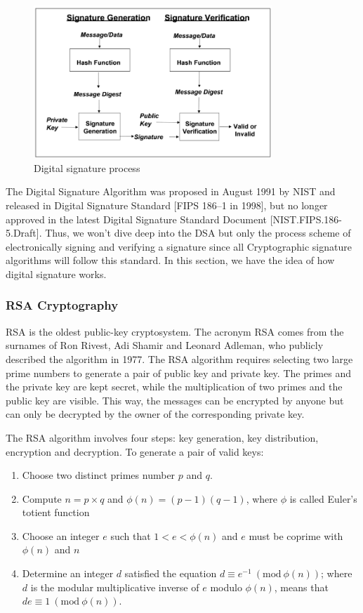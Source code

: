 \begin{figure}[ht!]
  \centering
  \includegraphics[width=0.8\textwidth]{images/digital_signature.png}
  \caption[Digital signature process]{Digital signature process}
  \label{fig:digital_signature}
\end{figure}

The Digital Signature Algorithm was proposed in August 1991 by NIST and released in Digital Signature Standard [FIPS 186–1 in 1998], but no longer approved in the latest Digital Signature Standard Document [NIST.FIPS.186-5.Draft].
Thus, we won't dive deep into the DSA but only the process scheme of electronically signing and verifying a signature since all Cryptographic signature algorithms will follow this standard.
In this section, we have the idea of how digital signature works.

\subsubsection{RSA Cryptography}

RSA is the oldest public-key cryptosystem. The acronym RSA comes from the surnames of Ron Rivest, Adi Shamir and Leonard Adleman, who publicly described the algorithm in 1977. The RSA algorithm requires selecting two large prime numbers to generate a pair of public key and private key. The primes and the private key are kept secret, while the multiplication of two primes and the public key are visible. This way, the messages can be encrypted by anyone but can only be decrypted by the owner of the corresponding private key.

The RSA algorithm involves four steps: key generation, key distribution, encryption and decryption. To generate a pair of valid keys:

\begin{enumerate}
  \item Choose two distinct primes number $p$ and $q$.
  \item Compute $n = p \times q$ and $\phi(n) = (p - 1)(q - 1)$, where $\phi$ is called Euler's totient function
  \item Choose an integer $e$ such that $1 < e < \phi(n)$ and $e$ must be coprime with $\phi(n)$ and $n$
  \item Determine an integer $d$ satisfied the equation $d \equiv e^{-1}\ (\textrm{mod}\ \phi(n))$; where $d$ is the modular multiplicative inverse of $e$ modulo $\phi(n)$, means that $de \equiv 1\ (\textrm{mod}\ \phi(n))$.
\end{enumerate}

